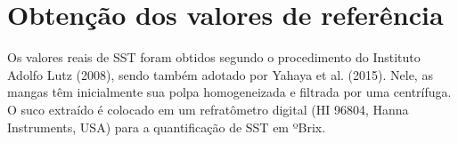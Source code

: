 \begin{figure}[!htb]
\end{figure}

\section{Obtenção dos valores de referência}

Os valores reais de SST foram obtidos segundo o procedimento do Instituto Adolfo Lutz (2008), sendo também adotado por Yahaya et al. (2015). Nele, as mangas têm inicialmente sua polpa homogeneizada e filtrada por uma centrífuga. O suco extraído é colocado em um refratômetro digital (HI 96804, Hanna Instruments, USA) para a quantificação de SST em ºBrix.

